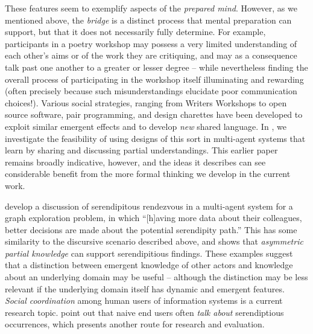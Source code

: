 These features seem to exemplify
aspects of the \emph{prepared mind}.  However, as we mentioned above,
the \emph{bridge} is a distinct process that mental preparation can
support, but that it does not necessarily fully determine.  For example, participants in
a poetry workshop may possess a very limited understanding of each
other's aims or of the work they are critiquing, and may as a
consequence talk past one another to a greater or lesser degree --
while nevertheless finding the overall process of participating in the
workshop itself illuminating and rewarding (often precisely because
such misunderstandings elucidate poor communication choices!).
Various social strategies, ranging from Writers Workshops to open
source software, pair programming, and design charettes
\cite[p. 11]{gabriel2002writer} have been developed to exploit similar
emergent effects and to develop \emph{new} shared language.  In
\cite{poetry-workshop}, we investigate the feasibility of using
designs of this sort in multi-agent systems that learn by sharing and
discussing partial understandings.  This earlier paper remains broadly
indicative, however, and the ideas it describes can see considerable
benefit from the more formal thinking we develop in the current work.

 develop a discussion of serendipitous
rendezvous in a multi-agent system for a graph exploration problem, in
which ``[h]aving more data about their colleagues, better decisions
are made about the potential serendipity path.''  This has some
similarity to the discursive scenario described above, and shows that
\emph{asymmetric partial knowledge} can support serendipitious
findings.  These examples suggest that a distinction between emergent
knowledge of other actors and knowledge about an underlying domain may
be useful -- although the distinction may be less relevant if
the underlying domain itself has dynamic and emergent features.
\emph{Social coordination} among human users of information systems is
a current research topic.  point out that
naive end users often \emph{talk about} serendiptious occurrences,
which presents another route for research and evaluation.

